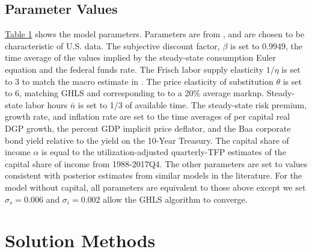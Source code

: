 \documentclass[12pt, final]{article}
\begin{document}
\subsection{Parameter Values} \hyperlink{Table 1}{Table 1} shows the model parameters. Parameters are from \hyperlink{Atkinson}{\color{black}{Atkinson et al.\ (2019)}}, and are chosen to be characteristic of U.S. data. The subjective discount factor, $\beta$ is set to $0.9949$, the time average of the values implied by the steady-state consumption Euler equation and the federal funds rate. The Frisch labor supply elasticity $1/\eta$ is set to 3 to match the macro estimate in \hyperlink{Peterman}{\color{black}{Peterman (2016)}}. The price elasticity of substitution $\theta$ is set to 6, matching GHLS and corresponding to to a 20\% average markup. Steady-state labor hours $\bar{n}$ is set to 1/3 of available time. The steady-state risk premium, growth rate, and inflation rate are set to the time averages of per capital real DGP growth, the percent GDP implicit price deflator, and the Baa corporate bond yield relative to the yield on the 10-Year Treasury. The capital share of income $\alpha$ is equal to the \hyperlink{Fernald}{\color{black}{Fernald (2012)}} utilization-adjusted quarterly-TFP estimates of the capital share of income from 1988-2017Q4. The other parameters are set to values consistent with posterior estimates from similar models in the literature. For the model without capital, all parameters are equivalent to those above except we set $\sigma_s=0.006$ and $\sigma_i=0.002$ allow the GHLS algorithm to converge.

\section[Section 3]{Solution Methods \hypertarget{Section 3}{}} 
\end{document}
